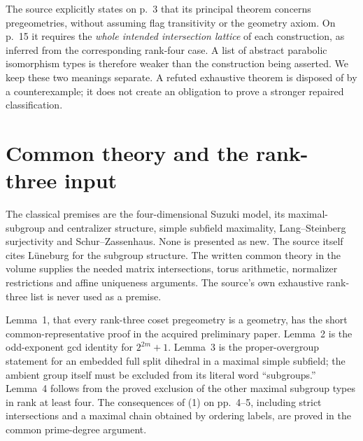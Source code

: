 \documentclass[11pt,a4paper]{article}
\begin{document}
The source explicitly states on p.~3 that its principal theorem concerns
pregeometries, without assuming flag transitivity or the geometry axiom.
On p.~15 it requires the \emph{whole intended intersection lattice} of
each construction, as inferred from the corresponding rank-four case.
A list of abstract parabolic isomorphism types is therefore weaker than
the construction being asserted. We keep these two meanings separate.
A refuted exhaustive theorem is disposed of by a counterexample; it does
not create an obligation to prove a stronger repaired classification.

\section{Common theory and the rank-three input}
The classical premises are the four-dimensional Suzuki model, its
maximal-subgroup and centralizer structure, simple subfield maximality,
Lang--Steinberg surjectivity and Schur--Zassenhaus. None is presented as
new. The source itself cites L\"uneburg for the subgroup structure.
The written common theory in the volume supplies the needed matrix
intersections, torus arithmetic, normalizer restrictions and affine
uniqueness arguments. The source's own exhaustive rank-three list is
never used as a premise.

Lemma~1, that every rank-three coset pregeometry is a geometry, has the
short common-representative proof in the acquired preliminary paper.
Lemma~2 is the odd-exponent gcd identity for $2^{2m}+1$.
Lemma~3 is the proper-overgroup statement for an embedded full split
dihedral in a maximal simple subfield; the ambient group itself must be
excluded from its literal word ``subgroups.'' Lemma~4 follows from the
proved exclusion of the other maximal subgroup types in rank at least
four. The consequences of (1) on pp.~4--5, including strict intersections
and a maximal chain obtained by ordering labels, are proved in the common
prime-degree argument.
\end{document}
